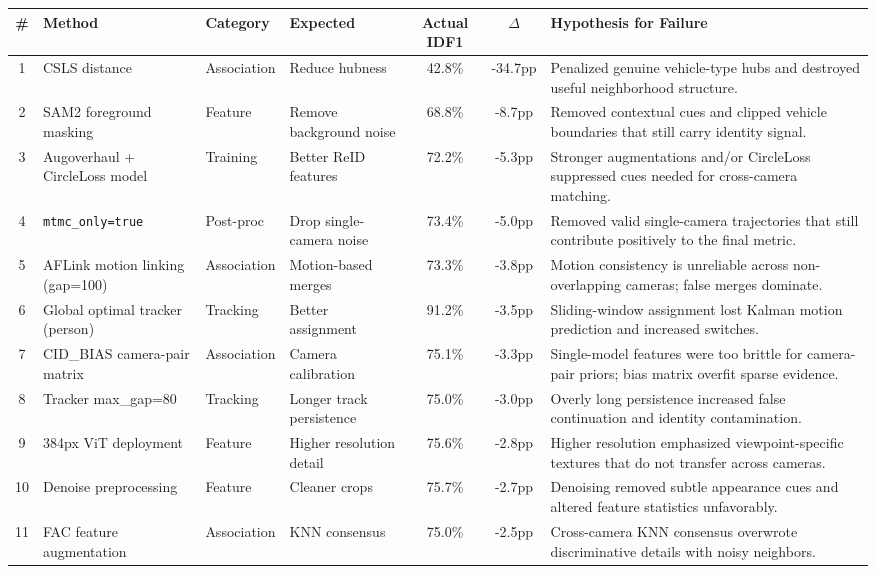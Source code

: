 \begingroup
\scriptsize
\setlength{\tabcolsep}{4pt}
\begin{tabularx}{\textwidth}{c l l l c c X}
\toprule
\# & Method & Category & Expected & Actual IDF1 & $\Delta$ & Hypothesis for Failure \\
\midrule
1 & CSLS distance & Association & Reduce hubness & 42.8\% & -34.7pp & Penalized genuine vehicle-type hubs and destroyed useful neighborhood structure. \\
2 & SAM2 foreground masking & Feature & Remove background noise & 68.8\% & -8.7pp & Removed contextual cues and clipped vehicle boundaries that still carry identity signal. \\
3 & Augoverhaul + CircleLoss model & Training & Better ReID features & 72.2\% & -5.3pp & Stronger augmentations and/or CircleLoss suppressed cues needed for cross-camera matching. \\
4 & \texttt{mtmc\_only=true} & Post-proc & Drop single-camera noise & 73.4\% & -5.0pp & Removed valid single-camera trajectories that still contribute positively to the final metric. \\
5 & AFLink motion linking (gap=100) & Association & Motion-based merges & 73.3\% & -3.8pp & Motion consistency is unreliable across non-overlapping cameras; false merges dominate. \\
6 & Global optimal tracker (person) & Tracking & Better assignment & 91.2\% & -3.5pp & Sliding-window assignment lost Kalman motion prediction and increased switches. \\
7 & CID\_BIAS camera-pair matrix & Association & Camera calibration & 75.1\% & -3.3pp & Single-model features were too brittle for camera-pair priors; bias matrix overfit sparse evidence. \\
8 & Tracker max\_gap=80 & Tracking & Longer track persistence & 75.0\% & -3.0pp & Overly long persistence increased false continuation and identity contamination. \\
9 & 384px ViT deployment & Feature & Higher resolution detail & 75.6\% & -2.8pp & Higher resolution emphasized viewpoint-specific textures that do not transfer across cameras. \\
10 & Denoise preprocessing & Feature & Cleaner crops & 75.7\% & -2.7pp & Denoising removed subtle appearance cues and altered feature statistics unfavorably. \\
11 & FAC feature augmentation & Association & KNN consensus & 75.0\% & -2.5pp & Cross-camera KNN consensus overwrote discriminative details with noisy neighbors. \\

\end{tabularx}
